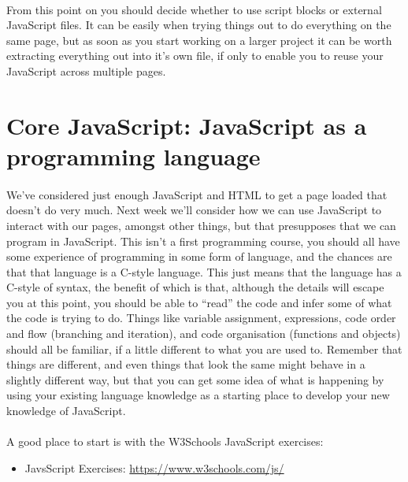 \documentclass[10pt, a4paper, twosize]{article}
\begin{document}
\paragraph{} From this point on you should decide whether to use script blocks or external JavaScript files. It can be easily when trying things out to do everything on the same page, but as soon as you start working on a larger project it can be worth extracting everything out into it's own file, if only to enable you to reuse your JavaScript across multiple pages.

\section{Core JavaScript: JavaScript as a programming language}
\paragraph{} We've considered just enough JavaScript and HTML to get a page loaded that doesn't do very much. Next week we'll consider how we can use JavaScript to interact with our pages, amongst other things, but that presupposes that we can program in JavaScript. This isn't a first programming course, you should all have some experience of programming in some form of language, and the chances are that that language is a C-style language. This just means that the language has a C-style of syntax, the benefit of which is that, although the details will escape you at this point, you should be able to ``read'' the code and infer some of what the code is trying to do. Things like variable assignment, expressions, code order and flow (branching and iteration), and code organisation (functions and objects) should all be familiar, if a little different to what you are used to. Remember that things are different, and even things that look the same might behave in a slightly different way, but that you can get some idea of what is happening by using your existing language knowledge as a starting place to develop your new knowledge of JavaScript.

\paragraph{} A good place to start is with the W3Schools JavaScript exercises:
\begin{itemize}
\item JavsScript Exercises: \url{https://www.w3schools.com/js/}
\end{itemize}
\end{document}
